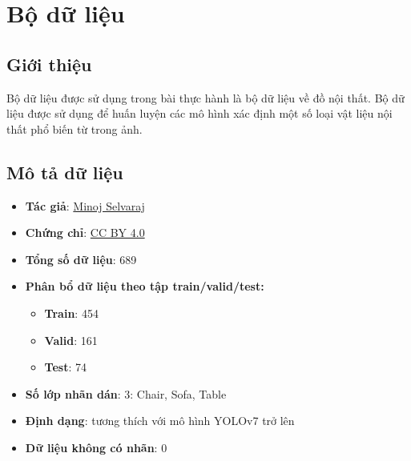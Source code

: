 \section{Bộ dữ liệu}
\subsection{Giới thiệu}
Bộ dữ liệu được sử dụng trong bài thực hành là bộ dữ liệu về đồ nội thất. Bộ dữ liệu được sử dụng để huấn luyện các mô hình xác định một số loại vật liệu nội thất phổ biến từ trong ảnh.
\subsection{Mô tả dữ liệu}
\begin{itemize}
    \item \textbf{Tác giả}: \href{https://universe.roboflow.com/minoj-selvaraj/}{Minoj Selvaraj}
    \item \textbf{Chứng chỉ}: \href{https://creativecommons.org/licenses/by/4.0/}{CC BY 4.0}
    \item \textbf{Tổng số dữ liệu}: 689
    \item \textbf{Phân bổ dữ liệu theo tập train/valid/test:}
    \begin{itemize}
        \item \textbf{Train}: 454
        \item \textbf{Valid}: 161
        \item \textbf{Test}: 74
    \end{itemize}
    \item \textbf{Số lớp nhãn dán}: 3: Chair, Sofa, Table
    \item \textbf{Định dạng}: tương thích với mô hình YOLOv7 trở lên 
    \item \textbf{Dữ liệu không có nhãn}: 0
\end{itemize}

